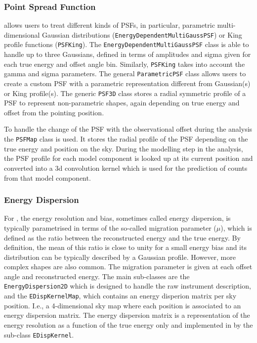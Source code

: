 \documentclass[longauth]{aa}
\newcommand{\code}[1]{\texttt{#1}}
\begin{document}
\subsubsection{Point Spread Function}
\gammapy allows users to treat different kinds of PSFs,
in particular, parametric multi-dimensional Gaussian distributions (\code{EnergyDependentMultiGaussPSF})
or King profile functions (\code{PSFKing}). The \code{EnergyDependentMultiGaussPSF}
class is able to handle up to three
Gaussians, defined in terms of amplitudes and sigma given for each true energy
and offset angle bin. Similarly, \code{PSFKing} takes into account the gamma and
sigma parameters. The general \code{ParametricPSF} class allows users to create a
custom PSF with a parametric representation different from Gaussian(s) or King profile(s).
The generic \code{PSF3D} class stores a radial symmetric profile of a
PSF to represent non-parametric shapes, again depending on true energy
and offset from the pointing position.

To handle the change of the PSF with the observational offset during the analysis 
the \code{PSFMap} class is used. It stores the radial profile of the PSF
depending on the true energy and position on the sky. During the modelling
step in the analysis, the PSF profile for each model component is 
looked up at its current position and converted into a 3d convolution kernel
which is used for the prediction of counts from that model component.


\subsubsection{Energy Dispersion}
For \iacts, the energy resolution and bias, sometimes called energy dispersion,
is typically parametrised in terms of the so-called
migration parameter ($\mu$), which is defined as the ratio between the
reconstructed energy and the true energy. By definition, the mean of this ratio is
close to unity for a small energy bias and its distribution can 
be typically described by a Gaussian profile. However, more complex
shapes are also common. The migration parameter is given at each offset angle and
reconstructed energy. The main sub-classes are the \code{EnergyDispersion2D} which is
designed to handle the raw instrument description, and the \code{EDispKernelMap},
which contains an energy disperion matrix per sky position. I.e., a 4-dimensional
sky map where each position is associated to an energy dispersion matrix.
The energy dispersion matrix is a representation of the energy resolution
as a function of the true energy only and implemented in \gammapy
by the sub-class \code{EDispKernel}.
\end{document}
